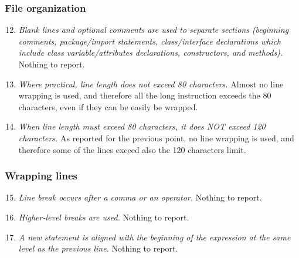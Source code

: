 	\subsubsection{File organization}
		\begin{enumerate}
			\setcounter{enumi}{11}
			\item \textit{Blank lines and optional comments are used to separate sections (beginning comments, package/import statements, class/interface declarations which include class variable/attributes declarations, constructors, and methods).}\newline
			Nothing to report. %

			\item \textit{Where practical, line length does not exceed 80 characters.}\newline
			Almost no line wrapping is used, and therefore all the long instruction exceeds the 80 characters, even if they can be easily be wrapped.

			\item \textit{When line length must exceed 80 characters, it does NOT exceed 120 characters.}\newline
			As reported for the previous point, no line wrapping is used, and therefore some of the lines exceed also the 120 characters limit.
		\end{enumerate}

	\subsubsection{Wrapping lines}
		\begin{enumerate}
			\setcounter{enumi}{14}
			\item \textit{Line break occurs after a comma or an operator.}\newline
			Nothing to report. %

			\item \textit{Higher-level breaks are used.}\newline
			Nothing to report. %

			\item \textit{A new statement is aligned with the beginning of the expression at the same level as the previous line.}\newline
			Nothing to report. %
		\end{enumerate}

